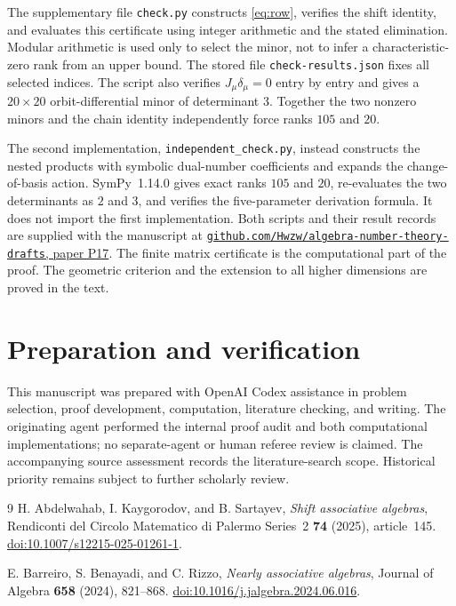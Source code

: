 \documentclass[11pt]{article}
\theoremstyle{remark}
\begin{document}
The supplementary file \texttt{check.py} constructs \eqref{eq:row}, verifies the shift identity, and evaluates this certificate using integer arithmetic and the stated elimination. Modular arithmetic is used only to select the minor, not to infer a characteristic-zero rank from an upper bound. The stored file \texttt{check-results.json} fixes all selected indices. The script also verifies $J_\mu\delta_\mu=0$ entry by entry and gives a $20\times20$ orbit-differential minor of determinant $3$. Together the two nonzero minors and the chain identity independently force ranks $105$ and $20$.

\newpage
The second implementation, \texttt{independent\_check.py}, instead constructs the nested products with symbolic dual-number coefficients and expands the change-of-basis action. SymPy~1.14.0 gives exact ranks $105$ and $20$, re-evaluates the two determinants as $2$ and $3$, and verifies the five-parameter derivation formula. It does not import the first implementation. Both scripts and their result records are supplied with the manuscript at
\href{https://github.com/Hwzw/algebra-number-theory-drafts/tree/main/papers/P17-rigid-shift-associative}{\texttt{github.com/Hwzw/algebra-number-theory-drafts}, paper P17}.
The finite matrix certificate is the computational part of the proof. The geometric criterion and the extension to all higher dimensions are proved in the text.

\section*{Preparation and verification}
This manuscript was prepared with OpenAI Codex assistance in problem selection, proof development, computation, literature checking, and writing. The originating agent performed the internal proof audit and both computational implementations; no separate-agent or human referee review is claimed. The accompanying source assessment records the literature-search scope. Historical priority remains subject to further scholarly review.

\begin{thebibliography}{9}
H. Abdelwahab, I. Kaygorodov, and B. Sartayev,
\emph{Shift associative algebras},
Rendiconti del Circolo Matematico di Palermo Series~2 \textbf{74} (2025), article~145.
\href{https://doi.org/10.1007/s12215-025-01261-1}{doi:10.1007/s12215-025-01261-1}.

E. Barreiro, S. Benayadi, and C. Rizzo,
\emph{Nearly associative algebras},
Journal of Algebra \textbf{658} (2024), 821--868.
\href{https://doi.org/10.1016/j.jalgebra.2024.06.016}{doi:10.1016/j.jalgebra.2024.06.016}.
\end{thebibliography}
\end{document}
